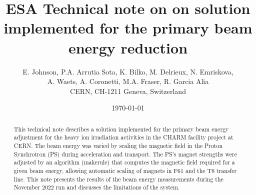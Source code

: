 \documentclass{cernatsnote}
\title{ESA Technical note on on solution implemented for the primary beam energy reduction}
\author{
	E. Johnson, P.A. Arrutia Sota, K. Bilko, M. Delrieux, N. Emriskova,\\ A. Waets, A. Coronetti,  M.A. Fraser, R. Garcia Alia\; \\		
	CERN, CH-1211 Geneva, Switzerland
}
\date{\today}
\begin{document}
\maketitle

\begin{abstract}
This technical note describes a solution implemented for the primary beam energy adjustment for the heavy ion irradiation activities in the CHARM facility project at CERN. The beam energy was varied by scaling the magnetic field in the Proton Synchrotron (PS) during acceleration and transport. The PS's magnet strengths were adjusted by an algorithm (makerule) that computes the magnetic field required for a given beam energy, allowing automatic scaling of magnets in F61 and the T8 transfer line. This note presents the results of the beam energy measurements during the November 2022 run and discusses the limitations of the system.

\end{abstract}
\\ \\ \\ 

\newpage
\end{document}
